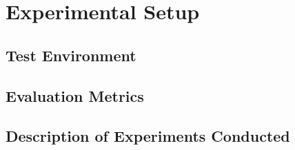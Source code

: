 \chapter{Experimental Setup}

\section{Test Environment}

\section{Evaluation Metrics}

\section{Description of Experiments Conducted}